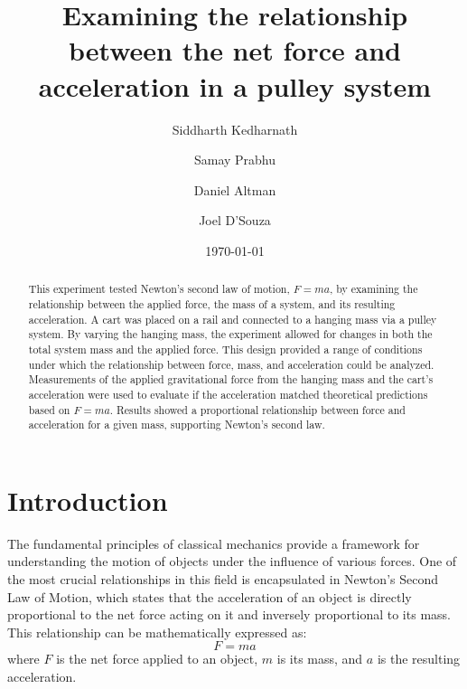 ﻿\documentclass[reprint,amsmath,amssymb,aps]{revtex4-2}
\begin{document}
\title{Examining the relationship between the net force and acceleration in a pulley system}
\author{Siddharth Kedharnath}
\author{Samay Prabhu}
\author{Daniel Altman}
\author{Joel D'Souza}
\date{\today}

\begin{abstract}
This experiment tested Newton’s second law of motion, $F=ma$, by examining the relationship between the applied force, the mass of a system, and its resulting acceleration. A cart was placed on a rail and connected to a hanging mass via a pulley system. By varying the hanging mass, the experiment allowed for changes in both the total system mass and the applied force. This design provided a range of conditions under which the relationship between force, mass, and acceleration could be analyzed. Measurements of the applied gravitational force from the hanging mass and the cart's acceleration were used to evaluate if the acceleration matched theoretical predictions based on $F=ma$. Results showed a proportional relationship between force and acceleration for a given mass, supporting Newton’s second law.
\end{abstract}


\maketitle







\section{Introduction}
The fundamental principles of classical mechanics provide a framework for understanding the motion of objects under the influence of various forces. One of the most crucial relationships in this field is encapsulated in Newton's Second Law of Motion\cite{tipler}, which states that the acceleration of an object is directly proportional to the net force acting on it and inversely proportional to its mass. This relationship can be mathematically expressed as:
\begin{equation}
F = ma
\end{equation}
where $F$ is the net force applied to an object, $m$ is its mass, and $a$ is the resulting acceleration.
\end{document}
